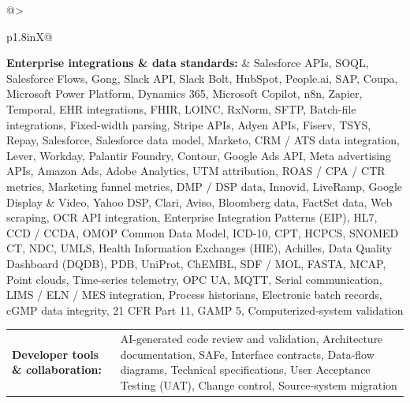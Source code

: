 \documentclass[letterpaper,11pt]{article}
\begin{document}
\begin{tabularx}{\linewidth}{@{}>{\raggedright\arraybackslash}p{1.8in}X@{}}
\textbf{Enterprise integrations \& data standards:} & \footnotesize{Salesforce APIs, SOQL, Salesforce Flows, Gong, Slack API, Slack Bolt, HubSpot, People.ai, SAP, Coupa, Microsoft Power Platform, Dynamics 365, Microsoft Copilot, n8n, Zapier, Temporal, EHR integrations, FHIR, LOINC, RxNorm, SFTP, Batch-file integrations, Fixed-width parsing, Stripe APIs, Adyen APIs, Fiserv, TSYS, Repay, Salesforce, Salesforce data model, Marketo, CRM / ATS data integration, Lever, Workday, Palantir Foundry, Contour, Google Ads API, Meta advertising APIs, Amazon Ads, Adobe Analytics, UTM attribution, ROAS / CPA / CTR metrics, Marketing funnel metrics, DMP / DSP data, Innovid, LiveRamp, Google Display \& Video, Yahoo DSP, Clari, Aviso, Bloomberg data, FactSet data, Web scraping, OCR API integration, Enterprise Integration Patterns (EIP), HL7, CCD / CCDA, OMOP Common Data Model, ICD-10, CPT, HCPCS, SNOMED CT, NDC, UMLS, Health Information Exchanges (HIE), Achilles, Data Quality Dashboard (DQDB), PDB, UniProt, ChEMBL, SDF / MOL, FASTA, MCAP, Point clouds, Time-series telemetry, OPC UA, MQTT, Serial communication, LIMS / ELN / MES integration, Process historians, Electronic batch records, cGMP data integrity, 21 CFR Part 11, GAMP 5, Computerized-system validation}\\
\end{tabularx}
\par\vspace{2pt}
\begin{tabularx}{\linewidth}{@{}>{\raggedright\arraybackslash}p{1.8in}X@{}}
\textbf{Developer tools \& collaboration:} & \footnotesize{AI-generated code review and validation, Architecture documentation, SAFe, Interface contracts, Data-flow diagrams, Technical specifications, User Acceptance Testing (UAT), Change control, Source-system migration}\\
\end{tabularx}
\par\vspace{2pt}
\end{document}
